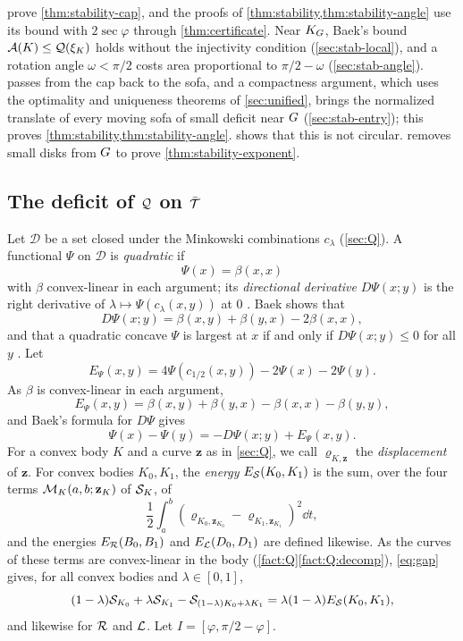  prove \cref{thm:stability-cap}, and
the proofs of \cref{thm:stability,thm:stability-angle} use its bound with
$2\sec\varphi$ through \cref{thm:certificate}. Near
$K_G$, Baek's bound $\mathcal{A}(K)\le\mathcal{Q}(\xi_K)$ holds without the injectivity
condition (\cref{sec:stab-local}), and a rotation angle $\omega<\pi/2$ costs
area proportional to $\pi/2-\omega$ (\cref{sec:stab-angle}).
 passes from the cap back to the sofa, and a compactness
argument, which uses the optimality and uniqueness theorems of
\cref{sec:unified}, brings the normalized translate of every moving sofa of
small deficit near $G$ (\cref{sec:stab-entry}); this proves
\cref{thm:stability,thm:stability-angle}.  shows
that this is not circular.  removes small disks from
$G$ to prove \cref{thm:stability-exponent}.

\subsection{The deficit of \texorpdfstring{$\mathcal{Q}$}{Q} on
\texorpdfstring{$\bar{\mathcal{T}}$}{the enlarged domain}}\label{sec:stab-certificate}

Let $\mathcal D$ be a set closed under the Minkowski combinations $c_\lambda$
(\cref{sec:Q}). A functional $\Psi$ on $\mathcal D$ is \emph{quadratic} if
\[
  \Psi(x)=\beta(x,x)
\]
with $\beta$ convex-linear in each argument; its
\emph{directional derivative} $D\Psi(x;y)$ is the right derivative of
$\lambda\mapsto\Psi(c_\lambda(x,y))$ at $0$ .
Baek shows that
\[
  D\Psi(x;y)=\beta(x,y)+\beta(y,x)-2\beta(x,x),
\]
and that a quadratic concave $\Psi$ is largest at $x$ if and only if
$D\Psi(x;y)\le0$ for all $y$ . Let
\[
  E_\Psi(x,y)=4\Psi(c_{1/2}(x,y))-2\Psi(x)-2\Psi(y).
\]
As $\beta$ is convex-linear in each argument,
\[
  E_\Psi(x,y)=\beta(x,y)+\beta(y,x)-\beta(x,x)-\beta(y,y),
\]
and Baek's formula for $D\Psi$ gives
\begin{equation}\label{eq:stab-segment}
  \Psi(x)-\Psi(y)=-D\Psi(x;y)+E_\Psi(x,y).
\end{equation}
For a convex body $K$ and a curve $\mathbf z$ as in \cref{sec:Q}, we call
$\varrho_{K,\mathbf z}$ the \emph{displacement} of $\mathbf z$. For convex
bodies $K_0,K_1$, the \emph{energy} $E_{\mathcal{S}}(K_0,K_1)$ is the sum, over the four
terms $\mathcal{M}_K(a,b;\mathbf z_K)$ of $\mathcal{S}_K$, of
\[
  \frac12\int_a^b(\varrho_{K_0,\mathbf z_{K_0}}-\varrho_{K_1,\mathbf z_{K_1}})^2
  \dd t,
\]
and the energies $E_{\mathcal{R}}(B_0,B_1)$ and $E_{\mathcal{L}}(D_0,D_1)$ are defined likewise. As
the curves of these terms are convex-linear in the body
(\cref{fact:Q}\ref{fact:Q:decomp}), \eqref{eq:gap} gives, for all convex bodies
and $\lambda\in[0,1]$,
\begin{equation}\label{eq:stab-gap}
  (1-\lambda)\mathcal{S}_{K_0}+\lambda\mathcal{S}_{K_1}-\mathcal{S}_{(1-\lambda)K_0+\lambda K_1}
    =\lambda(1-\lambda)E_{\mathcal{S}}(K_0,K_1),
\end{equation}
and likewise for $\mathcal{R}$ and $\mathcal{L}$. Let $I=[\varphi,\pi/2-\varphi]$.

